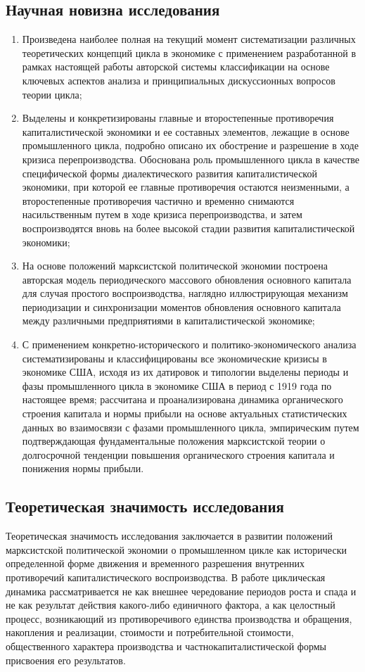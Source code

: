 \subsection*{Научная новизна исследования}
\begin{enumerate}
    \item Произведена наиболее полная на текущий момент систематизации различных теоретических концепций цикла в экономике с применением разработанной в рамках настоящей работы авторской системы классификации на основе ключевых аспектов анализа и принципиальных дискуссионных вопросов теории цикла;
    \item Выделены и конкретизированы главные и второстепенные противоречия капиталистической экономики и ее составных элементов, лежащие в основе промышленного цикла, подробно описано их обострение и разрешение в ходе кризиса перепроизводства. Обоснована роль промышленного цикла в качестве специфической формы диалектического развития капиталистической экономики, при которой ее главные противоречия остаются неизменными, а второстепенные противоречия частично и временно снимаются насильственным путем в ходе кризиса перепроизводства, и затем воспроизводятся вновь на более высокой стадии развития капиталистической экономики;
    \item На основе положений марксистской политической экономии построена авторская модель периодического массового обновления основного капитала для случая простого воспроизводства, наглядно иллюстрирующая механизм периодизации и синхронизации моментов обновления основного капитала между различными предприятиями в капиталистической экономике;
    \item С применением конкретно-исторического и политико-экономического анализа систематизированы и классифицированы все экономические кризисы в экономике США, исходя из их датировок и типологии выделены периоды и фазы промышленного цикла в экономике США в период с 1919 года по настоящее время; рассчитана и проанализирована динамика органического строения капитала и нормы прибыли на основе актуальных статистических данных во взаимосвязи с фазами промышленного цикла, эмпирическим путем подтверждающая фундаментальные положения марксистской теории о долгосрочной тенденции повышения органического строения капитала и понижения нормы прибыли.
\end{enumerate}

\subsection*{Теоретическая значимость исследования}
Теоретическая значимость исследования заключается в развитии положений марксистской политической экономии о промышленном цикле как исторически определенной форме движения и временного разрешения внутренних противоречий капиталистического воспроизводства. В работе циклическая динамика рассматривается не как внешнее чередование периодов роста и спада и не как результат действия какого-либо единичного фактора, а как целостный процесс, возникающий из противоречивого единства производства и обращения, накопления и реализации, стоимости и потребительной стоимости, общественного характера производства и частнокапиталистической формы присвоения его результатов.

